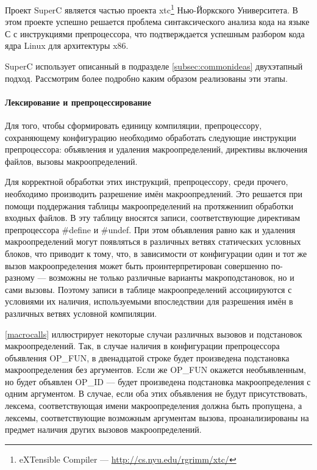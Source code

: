 Проект SuperC является частью проекта xtc\footnote{eXTensible Compiler --- \url{http://cs.nyu.edu/rgrimm/xtc/}} Нью-Йоркского Университета. В этом проекте успешно решается проблема синтаксического анализа кода на языке С с инструкциями препроцессора, что подтверждается успешным разбором кода ядра Linux для архитектуры x86.

SuperC использует описанный в подразделе \ref{subsec:commonideas} двухэтапный подход. Рассмотрим более подробно каким образом реализованы эти этапы.

\paragraph{Лексирование и препроцессирование}
\label{lexingandpreprocessing}

Для того, чтобы сформировать единицу компиляции, препроцессору, сохраняющему конфигурацию необходимо обработать следующие инструкции препроцессора: объявления и удаления макроопределений, директивы включения файлов, вызовы макроопределений.

Для корректной обработки этих инструкций, препроцессору, среди прочего, необходимо производить разрешение имён макроопредлений. Это решается при помощи поддержания таблицы макроопределений на протяжениип обработки входных файлов. В эту таблицу вносятся записи, соответствующие директивам препроцессора \#define и \#undef. При этом объявления равно как и удаления макроопределений могут появляться в различных ветвях статических условных блоков, что приводит к тому, что, в зависимости от конфигурации один и тот же вызов макроопределения может быть проинтерпретирован совершенно по-разному --- возможны не только различные варианты макроподстановок, но и сами вызовы. Поэтому записи в таблице макроопределений ассоциируются с условиями их наличия, используемыми впоследствии для разрешения имён в различных ветвях условной компиляции.

\autoref{macrocalls} иллюстрирует некоторые случаи различных вызовов и подстановок макроопределений. Так, в случае наличия в конфигурации препроцессора объявления OP\_FUN, в двенадцатой строке будет произведена подстановка макроопределения без аргументов. Eсли же OP\_FUN окажется необъявленным, но будет объявлен OP\_ID --- будет произведена подстановка макроопределения с одним аргументом. В случае, если оба этих объявления не будут присутствовать, лексема, соответствующая имени макроопределения должна быть пропущена, а лексемы, соответствующие возможным аргументам вызова, проанализированы на предмет наличия других вызовов макроопределений.

